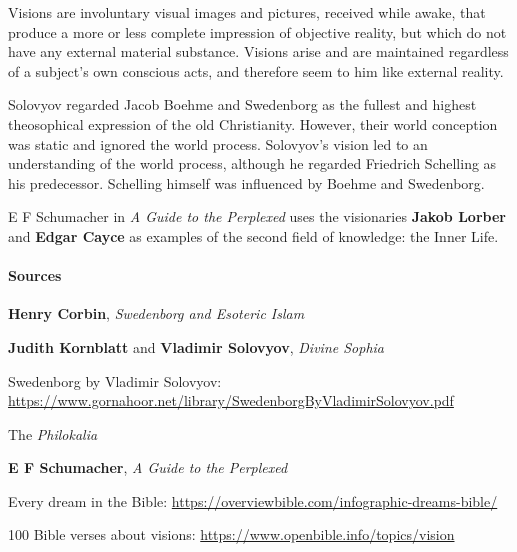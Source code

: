 \begin{quotex}
Visions are involuntary visual images and pictures, received while awake, that produce a more or less complete impression of objective reality, but which do not have any external material substance. Visions arise and are maintained regardless of a subject's own conscious acts, and therefore seem to him like external reality. 

\end{quotex}
Solovyov regarded Jacob Boehme and Swedenborg as the fullest and highest theosophical expression of the old Christianity. However, their world conception was static and ignored the world process. Solovyov's vision led to an understanding of the world process, although he regarded Friedrich Schelling as his predecessor. Schelling himself was influenced by Boehme and Swedenborg.

E F Schumacher in \emph{A Guide to the Perplexed} uses the visionaries \textbf{Jakob Lorber} and \textbf{Edgar Cayce} as examples of the second field of knowledge: the Inner Life.

\paragraph{Sources}

\textbf{Henry Corbin}, \emph{Swedenborg and Esoteric Islam}

\textbf{Judith Kornblatt} and \textbf{Vladimir Solovyov}, \emph{Divine Sophia}

Swedenborg by Vladimir Solovyov: \url{https://www.gornahoor.net/library/SwedenborgByVladimirSolovyov.pdf}

The \emph{Philokalia}

\textbf{E F Schumacher}, \emph{A Guide to the Perplexed}

Every dream in the Bible: \url{https://overviewbible.com/infographic-dreams-bible/}

100 Bible verses about visions: \url{https://www.openbible.info/topics/vision}



